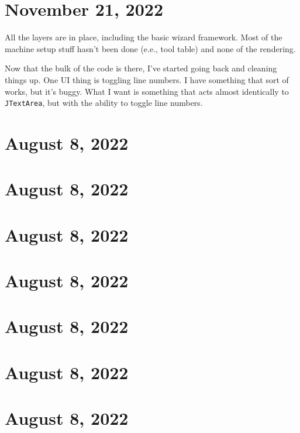 \documentclass{article}
\begin{document}
\section{November 21, 2022}

All the layers are in place, including the basic wizard
framework. Most of the machine setup stuff hasn't been done (e.e., tool
table) and none of the rendering.

Now that the bulk of the code is there, I've started going back and
cleaning things up. One UI thing is toggling line numbers. I have
something that sort of works, but it's buggy. What I want is something
that acts almost identically to {\tt JTextArea}, but with the ability
to toggle line numbers.

\section{August 8, 2022}
\section{August 8, 2022}
\section{August 8, 2022}
\section{August 8, 2022}
\section{August 8, 2022}
\section{August 8, 2022}
\section{August 8, 2022}
\end{document}

